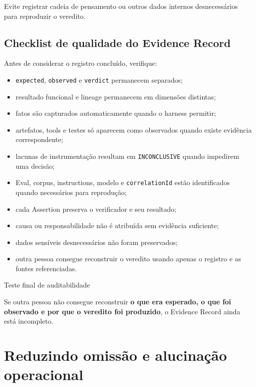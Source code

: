 \documentclass[
  10pt,
  a4paper,
  oneside]{book}
\providecommand{\tightlist}{%
  \setlength{\itemsep}{0pt}\setlength{\parskip}{0pt}}
\begin{document}
Evite registrar cadeia de pensamento ou outros dados internos
desnecessários para reproduzir o veredito.

\hypertarget{checklist-de-qualidade-do-evidence-record}{%
\subsection{Checklist de qualidade do Evidence
Record}\label{checklist-de-qualidade-do-evidence-record}}

Antes de considerar o registro concluído, verifique:

\begin{itemize}
\tightlist
\item
  \texttt{expected}, \texttt{observed} e \texttt{verdict} permanecem
  separados;
\item
  resultado funcional e lineage permanecem em dimensões distintas;
\item
  fatos são capturados automaticamente quando o harness permitir;
\item
  artefatos, tools e testes só aparecem como observados quando existe
  evidência correspondente;
\item
  lacunas de instrumentação resultam em \texttt{INCONCLUSIVE} quando
  impedirem uma decisão;
\item
  Eval, corpus, instructions, modelo e \texttt{correlationId} estão
  identificados quando necessários para reprodução;
\item
  cada Assertion preserva o verificador e seu resultado;
\item
  causa ou responsabilidade não é atribuída sem evidência suficiente;
\item
  dados sensíveis desnecessários não foram preservados;
\item
  outra pessoa consegue reconstruir o veredito usando apenas o registro
  e as fontes referenciadas.
\end{itemize}

\begin{tipbox}{Teste final de auditabilidade}

Se outra pessoa não consegue reconstruir \textbf{o que era esperado, o
que foi observado e por que o veredito foi produzido}, o Evidence Record
ainda está incompleto.

\end{tipbox}

\hypertarget{reduzindo-omissuxe3o-e-alucinauxe7uxe3o-operacional}{%
\section{Reduzindo omissão e alucinação
operacional}\label{reduzindo-omissuxe3o-e-alucinauxe7uxe3o-operacional}}
\end{document}
